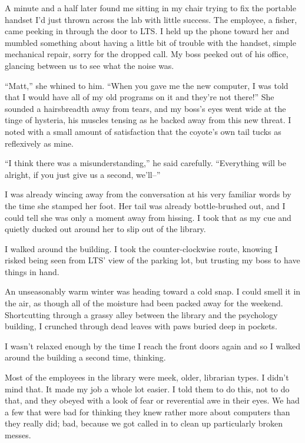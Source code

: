 A minute and a half later found me sitting in my chair trying to fix the portable handset I'd just thrown across the lab with little success. The employee, a fisher, came peeking in through the door to LTS. I held up the phone toward her and mumbled something about having a little bit of trouble with the handset, simple mechanical repair, sorry for the dropped call. My boss peeked out of his office, glancing between us to see what the noise was.

``Matt,'' she whined to him. ``When you gave me the new computer, I was told that I would have all of my old programs on it and they're not there!'' She sounded a hairsbreadth away from tears, and my boss's eyes went wide at the tinge of hysteria, his muscles tensing as he backed away from this new threat. I noted with a small amount of satisfaction that the coyote's own tail tucks as reflexively as mine.

``I think there was a misunderstanding,'' he said carefully. ``Everything will be alright, if you just give us a second, we'll--''

I was already wincing away from the conversation at his very familiar words by the time she stamped her foot. Her tail was already bottle-brushed out, and I could tell she was only a moment away from hissing. I took that as my cue and quietly ducked out around her to slip out of the library.

I walked around the building. I took the counter-clockwise route, knowing I risked being seen from LTS' view of the parking lot, but trusting my boss to have things in hand.

An unseasonably warm winter was heading toward a cold snap. I could smell it in the air, as though all of the moisture had been packed away for the weekend. Shortcutting through a grassy alley between the library and the psychology building, I crunched through dead leaves with paws buried deep in pockets.

I wasn't relaxed enough by the time I reach the front doors again and so I walked around the building a second time, thinking.

Most of the employees in the library were meek, older, librarian types. I didn't mind that. It made my job a whole lot easier. I told them to do this, not to do that, and they obeyed with a look of fear or reverential awe in their eyes. We had a few that were bad for thinking they knew rather more about computers than they really did; bad, because we got called in to clean up particularly broken messes.


